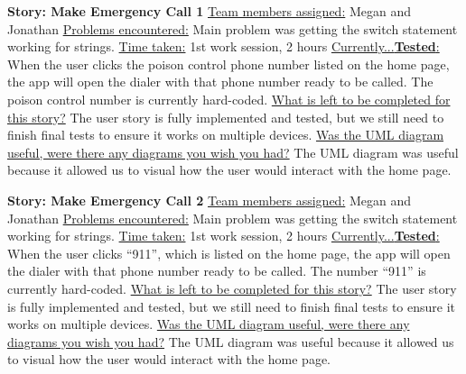 \documentclass[letterpaper,12pt,titlepage]{article}
\begin{document}
\noindent
\textbf{Story: Make Emergency Call 1}
\newline
\newline
\underline{Team members assigned:}
Megan and Jonathan
\newline
\underline{Problems encountered:}
Main problem was getting the switch statement working for strings.
\newline
\underline{Time taken:}
1st work session, 2 hours
\newline
\underline{Currently...\textbf{Tested}:}
When the user clicks the poison control phone number listed on the home page, the app will open the dialer with that phone number ready to be called. The poison control number is currently hard-coded.
\newline
\underline{What is left to be completed for this story?}
The user story is fully implemented and tested, but we still need to finish final tests to ensure it works on multiple devices.
\newline
\underline{Was the UML diagram useful, were there any diagrams you wish you had?}
The UML diagram was useful because it allowed us to visual how the user would interact with the home page.
\newline
\newline

\noindent
\textbf{Story: Make Emergency Call 2}
\newline
\newline
\underline{Team members assigned:}
Megan and Jonathan
\newline
\underline{Problems encountered:}
Main problem was getting the switch statement working for strings.
\newline
\underline{Time taken:}
1st work session, 2 hours
\newline
\underline{Currently...\textbf{Tested}:}
When the user clicks “911”, which is listed on the home page, the app will open the dialer with that phone number ready to be called. The number “911” is currently hard-coded.
\newline
\underline{What is left to be completed for this story?}
The user story is fully implemented and tested, but we still need to finish final tests to ensure it works on multiple devices.
\newline
\underline{Was the UML diagram useful, were there any diagrams you wish you had?}
The UML diagram was useful because it allowed us to visual how the user would interact with the home page.
\newline
\newline
\end{document}
